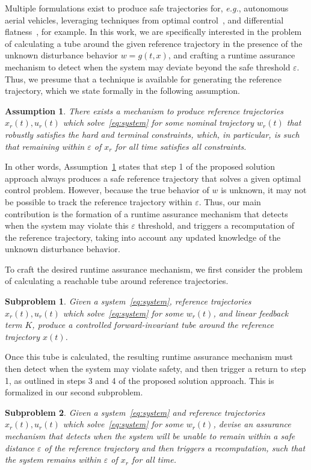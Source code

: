 \documentclass{IEEEojcsys}
\newtheorem{assumption}{Assumption}
\newtheorem{subproblem}{Subproblem}
\begin{document}
Multiple formulations exist to produce safe trajectories for, \emph{e.g.},  autonomous aerial vehicles, leveraging techniques from optimal control~\cite{heidari2021trajectory, HEHNtraj}, and differential flatness~\cite{murray1995differential, ChamseddineQuadrotor}, for example.
In this work, we are specifically interested in the problem of calculating a tube around the given reference trajectory in the presence of the unknown disturbance behavior $w=g(t,x)$, and crafting a runtime assurance mechanism to detect when the system may deviate beyond the safe threshold $\varepsilon$. Thus, we presume that a technique is available for generating the reference trajectory, which we state formally in the following assumption. 
\begin{assumption}
\label{assum:refs}
    There exists a mechanism to produce reference trajectories $x_r(t), u_r(t)$ which solve~\eqref{eq:system} for some nominal trajectory $w_r(t)$ that robustly satisfies the hard and terminal constraints, which, in particular, is such that remaining within $\varepsilon$ of $x_r$ for all time satisfies all constraints.
\end{assumption}
In other words, Assumption~\ref{assum:refs} states that step 1 of the proposed solution approach always produces a safe reference trajectory that solves a given optimal control problem. However, because the true behavior of $w$ is unknown, it may not be possible to track the reference trajectory within $\varepsilon$. Thus, our main contribution is the formation of a runtime assurance mechanism that detects when the system may violate this $\varepsilon$ threshold, and triggers a recomputation of the reference trajectory, taking into account any updated knowledge of the unknown disturbance behavior.

To craft the desired runtime assurance mechanism, we first consider the problem of calculating a reachable tube around reference trajectories.

\begin{subproblem}
     Given a system~\eqref{eq:system}, reference trajectories $x_r(t), u_r(t)$ which solve~\eqref{eq:system} for some $w_r(t)$, and linear feedback term $K$, produce a controlled forward-invariant tube around the reference trajectory $x(t)$.
\label{prob:finv}
\end{subproblem}

Once this tube is calculated, the resulting runtime assurance mechanism must then detect when the system may violate safety, and then trigger a return to step 1, as outlined in steps 3 and 4 of the proposed solution approach. This is formalized in our second subproblem.
\begin{subproblem}
    Given a system~\eqref{eq:system} and reference trajectories $x_r(t), u_r(t)$ which solve~\eqref{eq:system} for some $w_r(t)$, devise an assurance mechanism that detects when the system will be unable to remain within a safe distance $\varepsilon$ of the reference trajectory and then triggers a recomputation, such that the system remains within $\varepsilon$ of $x_r$ for all time.
    \label{prob:rta}
\end{subproblem}
\end{document}

